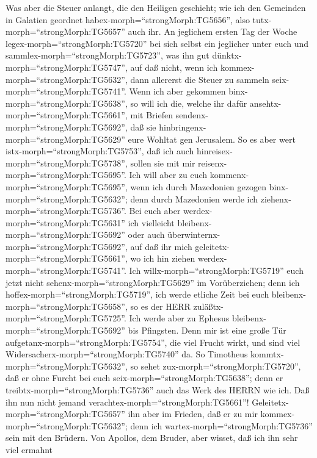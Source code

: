  Was aber die Steuer anlangt, die den Heiligen geschieht;
wie ich den Gemeinden in Galatien geordnet
habex-morph=``strongMorph:TG5656'', also
tutx-morph=``strongMorph:TG5657'' auch ihr.  An jeglichem
ersten Tag der Woche legex-morph=``strongMorph:TG5720'' bei sich selbst
ein jeglicher unter euch und sammlex-morph=``strongMorph:TG5723'', was
ihn gut dünktx-morph=``strongMorph:TG5747'', auf daß nicht, wenn ich
kommex-morph=``strongMorph:TG5632'', dann allererst die Steuer zu
sammeln seix-morph=``strongMorph:TG5741''.  Wenn ich aber
gekommen binx-morph=``strongMorph:TG5638'', so will ich die, welche ihr
dafür ansehtx-morph=``strongMorph:TG5661'', mit Briefen
sendenx-morph=``strongMorph:TG5692'', daß sie
hinbringenx-morph=``strongMorph:TG5629'' eure Wohltat gen Jerusalem.
 So es aber wert istx-morph=``strongMorph:TG5753'', daß ich
auch hinreisex-morph=``strongMorph:TG5738'', sollen sie mit mir
reisenx-morph=``strongMorph:TG5695''.  Ich will aber zu euch
kommenx-morph=``strongMorph:TG5695'', wenn ich durch Mazedonien gezogen
binx-morph=``strongMorph:TG5632''; denn durch Mazedonien werde ich
ziehenx-morph=``strongMorph:TG5736''.  Bei euch aber
werdex-morph=``strongMorph:TG5631'' ich vielleicht
bleibenx-morph=``strongMorph:TG5692'' oder auch
überwinternx-morph=``strongMorph:TG5692'', auf daß ihr mich
geleitetx-morph=``strongMorph:TG5661'', wo ich hin ziehen
werdex-morph=``strongMorph:TG5741''.  Ich
willx-morph=``strongMorph:TG5719'' euch jetzt nicht
sehenx-morph=``strongMorph:TG5629'' im Vorüberziehen; denn ich
hoffex-morph=``strongMorph:TG5719'', ich werde etliche Zeit bei euch
bleibenx-morph=``strongMorph:TG5658'', so es der HERR
zuläßtx-morph=``strongMorph:TG5725''.  Ich werde aber zu
Ephesus bleibenx-morph=``strongMorph:TG5692'' bis Pfingsten.
 Denn mir ist eine große Tür
aufgetanx-morph=``strongMorph:TG5754'', die viel Frucht wirkt, und sind
viel Widersacherx-morph=``strongMorph:TG5740'' da.  So
Timotheus kommtx-morph=``strongMorph:TG5632'', so sehet
zux-morph=``strongMorph:TG5720'', daß er ohne Furcht bei euch
seix-morph=``strongMorph:TG5638''; denn er
treibtx-morph=``strongMorph:TG5736'' auch das Werk des HERRN wie ich.
 Daß ihn nun nicht jemand
verachtex-morph=``strongMorph:TG5661''!
Geleitetx-morph=``strongMorph:TG5657'' ihn aber im Frieden, daß er zu
mir kommex-morph=``strongMorph:TG5632''; denn ich
wartex-morph=``strongMorph:TG5736'' sein mit den Brüdern. 
Von Apollos, dem Bruder, aber wisset, daß ich ihn sehr viel ermahnt
